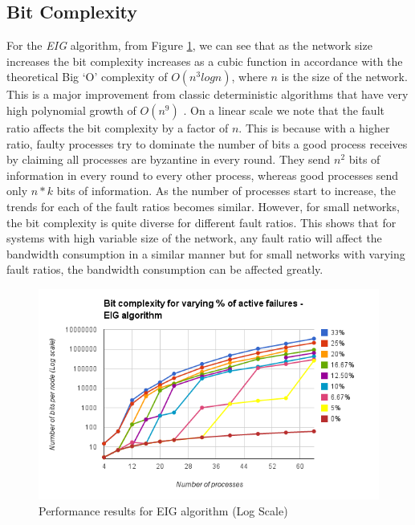 \subsection{Bit Complexity} For the \textit{EIG} algorithm, from Figure
\ref{fig:eig}, we can see that as the network size increases the bit complexity
increases as a cubic function in accordance with the theoretical Big `O'
complexity of $O(n^3 logn)$, where $n$ is the size of the network. This is
a major improvement from classic deterministic algorithms that have very high
polynomial growth of $O(n^9)$ \cite{GarayM98}. On a linear scale we note that
the fault ratio affects the bit complexity by a factor of $n$. This is because
with a higher ratio, faulty processes try to dominate the number of bits a good
process receives by claiming all processes are byzantine in every round. They
send $n^2$ bits of information in every round to every other process, whereas
good processes send only $n*k$ bits of information. As the number of processes
start to increase, the trends for each of the fault ratios becomes similar.
However, for small networks, the bit complexity is quite diverse for different
fault ratios. This shows that for systems with high variable size of the
network, any fault ratio will affect the bandwidth consumption in a similar
manner but for small networks with varying fault ratios, the bandwidth
consumption can be affected greatly.   \begin{figure}[ht] \centering
    \includegraphics[scale=0.4]{eig} 
    \caption{Performance results for EIG algorithm (Log Scale)} \label{fig:eig}
    \end{figure}

